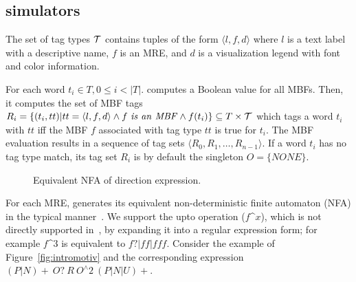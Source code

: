 \vspace{-1em}
\subsection{\framework simulators}

The set of tag types ${\cal T}$ contains tuples of the form $\langle l,f,d\rangle$ 
where $l$ is a text label with a descriptive name, 
$f$ is an MRE, and $d$ is a visualization legend 
with font and color information.

For each word $t_i\in T, 0\le i < |T|$.
\framework computes a Boolean value 
for all MBFs. 
Then, it computes the set of MBF tags
$R_i=\{(t_i,tt)| tt=\langle l,f,d\rangle \wedge
f~\mathit{is~an~MBF} \wedge f(t_i)\} \subseteq T \times {\cal T}$
which tags a word $t_i$ with $\mathit{tt}$ 
iff the MBF $f$ associated with
tag type $\mathit{tt}$ is true for $t_i$. 
The MBF evaluation results in a sequence of tag sets 
$\langle R_0, R_1, \ldots, R_{n-1}\rangle$.
If a word $t_i$ has no tag type match, 
its tag set $R_i$ is by default the singleton $O=\{\mathit{NONE}\}$.

\setarab
\transfalse
\begin{figure}[tb]
\centering
{}
\vspace{-1em}
  \caption{\label{fig:nfaEx}Equivalent NFA of direction expression.}
  \vspace{-1em}
\end{figure}
\transtrue
{}

For each MRE, 
\framework generates its equivalent non-deterministic finite automaton (NFA) in the typical manner~\cite{sipser2006introduction}.
We support the upto operation ($f$\^{}$x$), which is not directly 
supported in~\cite{sipser2006introduction}, by 
expanding it into a regular expression form; for example 
$f$\^{}$3$ is equivalent to $f?|ff|fff$. 
Consider the example of Figure~\ref{fig:intromotiv} and the
corresponding expression $(P|N)\!+~O?~R~O^\wedge 2~(P|N|U)+$. 

